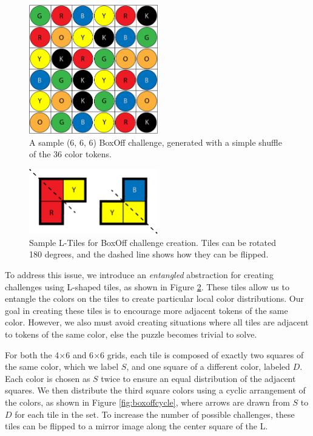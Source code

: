 \documentclass[journal]{IEEEtran}
\begin{document}
\begin{figure}[t]
\centering
\includegraphics[width=5.6cm]{figure3.png}
\caption{A sample (6, 6, 6) BoxOff challenge, generated with a simple shuffle of the 36 color tokens. }
\label{fig:boxoff666}
\end{figure}


\begin{figure}[t]
\centering
\includegraphics[width=5.6cm]{figure4.png}
\caption{Sample L-Tiles for BoxOff challenge creation. Tiles can be rotated 180 degrees, and the dashed line shows how they can be flipped. }
\label{fig:ltiles}
\end{figure}

To address this issue, we introduce an {\it entangled} abstraction for creating challenges using L-shaped tiles, as shown in Figure \ref{fig:ltiles}. These tiles allow us to entangle the colors on the tiles to create particular local color distributions.
Our goal in creating these tiles is to encourage more adjacent tokens of the same color. However, we also must avoid creating situations where all tiles are adjacent to tokens of the same color, else the puzzle becomes trivial to solve. 

For both the 4$\times$6 and 6$\times$6 grids, each tile is composed of exactly two squares of the same color, which we label $S$, and one square of a different color, labeled $D$. Each color is chosen as $S$ twice to ensure an equal distribution of the adjacent squares. We then distribute the third square colors using a cyclic arrangement of the colors, as shown in Figure \ref{fig:boxoffcycle}, where arrows are drawn from $S$ to $D$ for each tile in the set.  To increase the number of possible challenges, these tiles can be flipped to a mirror image along the center square of the L.
\end{document}

